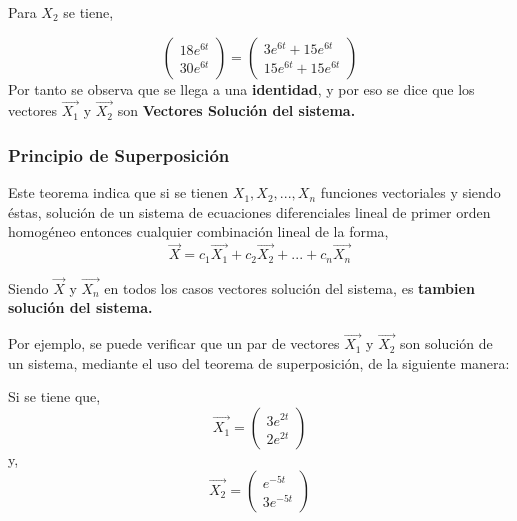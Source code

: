 \documentclass[titlepage]{article}
\begin{document}
            Para $X_2$ se tiene,
            
                \begin{equation*}
                    \begin{pmatrix}
                        18e^{6t}\\
                        30e^{6t}
                    \end{pmatrix}=
                    \begin{pmatrix}
                        3e^{6t} + 15e^{6t}\\
                        15e^{6t} + 15e^{6t}
                    \end{pmatrix}
                \end{equation*}\vspace{0.3cm}   
           Por tanto se observa que se llega a una \textbf{identidad}, y por eso se dice que los vectores $\vec{X_1}$ y $\vec{X_2}$ son \textbf{Vectores Solución del sistema.}
           
        \subsubsection{Principio de Superposición}
            
            Este teorema indica que si se tienen $X_1,X_2,...,X_n$ funciones vectoriales y siendo éstas, solución de un sistema de ecuaciones diferenciales lineal de primer orden homogéneo entonces cualquier combinación lineal de la forma,
                \begin{equation}
                    \vec{X} = c_1\vec{X_1} + c_2\vec{X_2} + ... + c_n\vec{X_n}
                \end{equation}
            
            Siendo $\vec{X}$ y $\vec{X_n}$ en todos los casos vectores solución del sistema, es \textbf{tambien solución del sistema.}\cite{Boyce2003a}\par\vspace{0.2cm}
            
            Por ejemplo, se puede verificar que un par de vectores $\vec{X_1}$ y $\vec{X_2}$ son solución de un sistema, mediante el uso del teorema de superposición, de la siguiente manera:\par
            Si se tiene que,
                \begin{equation*}
                    \vec{X_1} =
                    \begin{pmatrix}
                        3e^{2t}\\
                        2e^{2t}
                    \end{pmatrix}
                \end{equation*}
           y,
                 \begin{equation*}
                    \vec{X_2} =
                    \begin{pmatrix}
                        e^{-5t}\\
                        3e^{-5t}
                    \end{pmatrix}
                \end{equation*}
                
\end{document}
